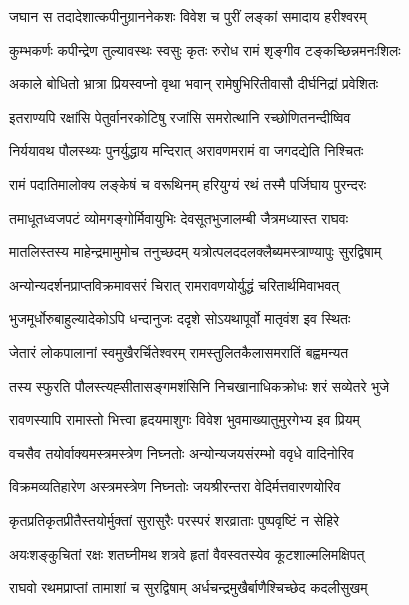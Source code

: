 \twolineshloka
{जघान स तदादेशात्कपीनुग्राननेकशः}
{विवेश च पुरीं लङ्कां समादाय हरीश्वरम्} %

\twolineshloka
{कुम्भकर्णः कपीन्द्रेण तुल्यावस्थः स्वसुः कृतः}
{रुरोध रामं शृङ्गीव टङ्कच्छिन्नमनःशिलः} %

\twolineshloka
{अकाले बोधितो भ्रात्रा प्रियस्वप्नो वृथा भवान्}
{रामेषुभिरितीवासौ दीर्घनिद्रां प्रवेशितः} %

\twolineshloka
{इतराण्यपि रक्षांसि पेतुर्वानरकोटिषु}
{रजांसि समरोत्थानि रच्छोणितनन्दीष्विव} %

\twolineshloka
{निर्ययावथ पौलस्थ्यः पुनर्युद्धाय मन्दिरात्}
{अरावणमरामं वा जगदद्येति निश्चितः} %

\twolineshloka
{रामं पदातिमालोक्य लङ्केषं च वरूथिनम्}
{हरियुग्यं रथं तस्मै पर्जिघाय पुरन्दरः} %

\twolineshloka
{तमाधूतध्वजपटं व्योमगङ्गोर्मिवायुभिः}
{देवसूतभुजालम्बी जैत्रमध्यास्त राघवः} %

\twolineshloka
{मातलिस्तस्य माहेन्द्रमामुमोच तनुच्छदम्}
{यत्रोत्पलददलक्लैब्यमस्त्राण्यापुः सुरद्विषाम्} %

\twolineshloka
{अन्योन्यदर्शनप्राप्तविक्रमावसरं चिरात्}
{रामरावणयोर्युद्धं चरितार्थमिवाभवत्} %

\twolineshloka
{भुजमूर्धोरुबाहुल्यादेकोऽपि धन्दानुजः}
{ददृशे सोऽयथापूर्वो मातृवंश इव स्थितः} %

\twolineshloka
{जेतारं लोकपालानां स्वमुखैरर्चितेश्वरम्}
{रामस्तुलितकैलासमरातिं बह्वमन्यत} %

\twolineshloka
{तस्य स्फुरति पौलस्त्यह्सीतासङ्गमशंसिनि}
{निचखानाधिकक्रोधः शरं सव्येतरे भुजे} %

\twolineshloka
{रावणस्यापि रामास्तो भित्त्वा हृदयमाशुगः}
{विवेश भुवमाख्यातुमुरगेभ्य इव प्रियम्} %

\twolineshloka
{वचसैव तयोर्वाक्यमस्त्रमस्त्रेण निघ्नतोः}
{अन्योन्यजयसंरम्भो ववृधे वादिनोरिव} %

\twolineshloka
{विक्रमव्यतिहारेण अस्त्रमस्त्रेण निघ्नतोः}
{जयश्रीरन्तरा वेदिर्मत्तवारणयोरिव} %

\twolineshloka
{कृतप्रतिकृतप्रीतैस्तयोर्मुक्तां सुरासुरैः}
{परस्परं शरव्राताः पुष्पवृष्टिं न सेहिरे} %

\twolineshloka
{अयःशङ्कुचितां रक्षः शतघ्नीमथ शत्रवे}
{हृतां वैवस्वतस्येव कूटशाल्मलिमक्षिपत्} %

\twolineshloka
{राघवो रथमप्राप्तां तामाशां च सुरद्विषाम्}
{अर्धचन्द्रमुखैर्बाणैश्चिच्छेद कदलीसुखम्} %

